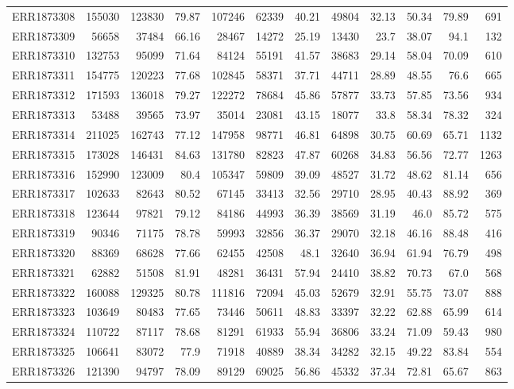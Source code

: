 \documentclass[12pt, oneside]{report}
\begin{document}
\begin{longtable}{@{}p{3.2cm}rrrrrrrrrrr@{}}
ERR1873308 & 155030 & 123830 & 79.87 & 107246 & 62339 & 40.21 & 49804 & 32.13 & 50.34 & 79.89 & 691 \\
ERR1873309 & 56658 & 37484 & 66.16 & 28467 & 14272 & 25.19 & 13430 & 23.7 & 38.07 & 94.1 & 132 \\
ERR1873310 & 132753 & 95099 & 71.64 & 84124 & 55191 & 41.57 & 38683 & 29.14 & 58.04 & 70.09 & 610 \\
ERR1873311 & 154775 & 120223 & 77.68 & 102845 & 58371 & 37.71 & 44711 & 28.89 & 48.55 & 76.6 & 665 \\
ERR1873312 & 171593 & 136018 & 79.27 & 122272 & 78684 & 45.86 & 57877 & 33.73 & 57.85 & 73.56 & 934 \\
ERR1873313 & 53488 & 39565 & 73.97 & 35014 & 23081 & 43.15 & 18077 & 33.8 & 58.34 & 78.32 & 324 \\
ERR1873314 & 211025 & 162743 & 77.12 & 147958 & 98771 & 46.81 & 64898 & 30.75 & 60.69 & 65.71 & 1132 \\
ERR1873315 & 173028 & 146431 & 84.63 & 131780 & 82823 & 47.87 & 60268 & 34.83 & 56.56 & 72.77 & 1263 \\
ERR1873316 & 152990 & 123009 & 80.4 & 105347 & 59809 & 39.09 & 48527 & 31.72 & 48.62 & 81.14 & 656 \\
ERR1873317 & 102633 & 82643 & 80.52 & 67145 & 33413 & 32.56 & 29710 & 28.95 & 40.43 & 88.92 & 369 \\
ERR1873318 & 123644 & 97821 & 79.12 & 84186 & 44993 & 36.39 & 38569 & 31.19 & 46.0 & 85.72 & 575 \\
ERR1873319 & 90346 & 71175 & 78.78 & 59993 & 32856 & 36.37 & 29070 & 32.18 & 46.16 & 88.48 & 416 \\
ERR1873320 & 88369 & 68628 & 77.66 & 62455 & 42508 & 48.1 & 32640 & 36.94 & 61.94 & 76.79 & 498 \\
ERR1873321 & 62882 & 51508 & 81.91 & 48281 & 36431 & 57.94 & 24410 & 38.82 & 70.73 & 67.0 & 568 \\
ERR1873322 & 160088 & 129325 & 80.78 & 111816 & 72094 & 45.03 & 52679 & 32.91 & 55.75 & 73.07 & 888 \\
ERR1873323 & 103649 & 80483 & 77.65 & 73446 & 50611 & 48.83 & 33397 & 32.22 & 62.88 & 65.99 & 614 \\
ERR1873324 & 110722 & 87117 & 78.68 & 81291 & 61933 & 55.94 & 36806 & 33.24 & 71.09 & 59.43 & 980 \\
ERR1873325 & 106641 & 83072 & 77.9 & 71918 & 40889 & 38.34 & 34282 & 32.15 & 49.22 & 83.84 & 554 \\
ERR1873326 & 121390 & 94797 & 78.09 & 89129 & 69025 & 56.86 & 45332 & 37.34 & 72.81 & 65.67 & 863 \\

\end{longtable}
\end{document}

